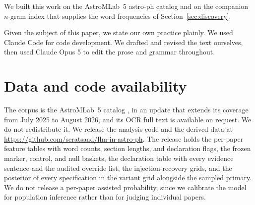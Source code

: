 \documentclass[twocolumn]{aastex631}
\begin{document}
We built this work on the AstroMLab~5 astro-ph catalog and on the companion $n$-gram index that supplies the word frequencies of Section~\ref{sec:discovery}.

Given the subject of this paper, we state our own practice plainly. We used Claude Code for code development. We drafted and revised the text ourselves, then used Claude Opus 5 to edit the prose and grammar throughout.

\section*{Data and code availability}
The corpus is the AstroMLab~5 catalog \citep{Ting2025}, in an update that extends its coverage from July 2025 to August 2026, and its OCR full text is available on request. We do not redistribute it. We release the analysis code and the derived data at \url{https://github.com/seratsaad/llm-in-astro-ph}. The release holds the per-paper feature tables with word counts, section lengths, and declaration flags, the frozen marker, control, and null baskets, the declaration table with every evidence sentence and the audited override list, the injection-recovery grids, and the posterior of every specification in the variant grid alongside the sampled primary. We do not release a per-paper assisted probability, since we calibrate the model for population inference rather than for judging individual papers.




\end{document}
